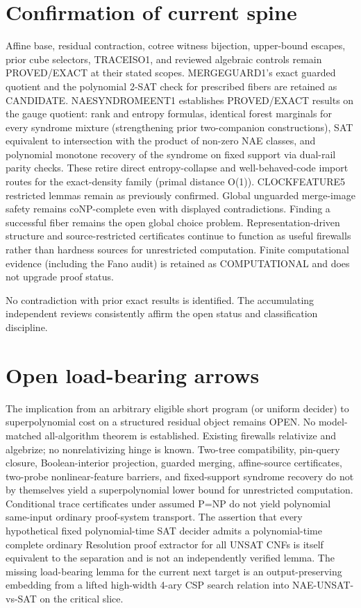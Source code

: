 \documentclass[11pt]{article}
\begin{document}
\section{Confirmation of current spine}
Affine base, residual contraction, cotree witness bijection, upper-bound escapes, prior cube selectors, TRACEISO1, and reviewed algebraic controls remain PROVED/EXACT at their stated scopes. MERGEGUARD1's exact guarded quotient and the polynomial 2-SAT check for prescribed fibers are retained as CANDIDATE. NAESYNDROMEENT1 establishes PROVED/EXACT results on the gauge quotient: rank and entropy formulas, identical forest marginals for every syndrome mixture (strengthening prior two-companion constructions), SAT equivalent to intersection with the product of non-zero NAE classes, and polynomial monotone recovery of the syndrome on fixed support via dual-rail parity checks. These retire direct entropy-collapse and well-behaved-code import routes for the exact-density family (primal distance O(1)). CLOCKFEATURE5 restricted lemmas remain as previously confirmed. Global unguarded merge-image safety remains coNP-complete even with displayed contradictions. Finding a successful fiber remains the open global choice problem. Representation-driven structure and source-restricted certificates continue to function as useful firewalls rather than hardness sources for unrestricted computation. Finite computational evidence (including the Fano audit) is retained as COMPUTATIONAL and does not upgrade proof status.

No contradiction with prior exact results is identified. The accumulating independent reviews consistently affirm the open status and classification discipline.

\section{Open load-bearing arrows}
The implication from an arbitrary eligible short program (or uniform decider) to superpolynomial cost on a structured residual object remains OPEN. No model-matched all-algorithm theorem is established. Existing firewalls relativize and algebrize; no nonrelativizing hinge is known. Two-tree compatibility, pin-query closure, Boolean-interior projection, guarded merging, affine-source certificates, two-probe nonlinear-feature barriers, and fixed-support syndrome recovery do not by themselves yield a superpolynomial lower bound for unrestricted computation. Conditional trace certificates under assumed P=NP do not yield polynomial same-input ordinary proof-system transport. The assertion that every hypothetical fixed polynomial-time SAT decider admits a polynomial-time complete ordinary Resolution proof extractor for all UNSAT CNFs is itself equivalent to the separation and is not an independently verified lemma. The missing load-bearing lemma for the current next target is an output-preserving embedding from a lifted high-width 4-ary CSP search relation into NAE-UNSAT-vs-SAT on the critical slice.
\end{document}
